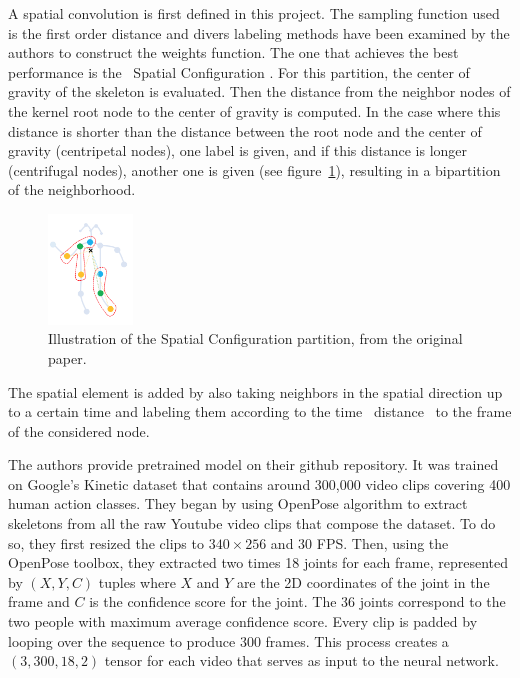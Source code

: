 \documentclass[12pt,a4paper,twoside]{article}
\begin{document}
A spatial convolution is first defined in this project. The sampling function used is the first order distance and divers labeling methods have been examined by the authors to construct the weights function. The one that achieves the best performance is the \guillemotleft~Spatial Configuration \guillemotright. For this partition, the center of gravity of the skeleton is evaluated. Then the distance from the neighbor nodes of the kernel root node to the center of gravity is computed. In the case where this distance is shorter than the distance between the root node and the center of gravity (centripetal nodes), one label is given, and if this distance is longer (centrifugal nodes), another one is given (see figure~\ref{fig:partition_strat}), resulting in a bipartition of the neighborhood.

\begin{figure}
    \centering
        \includegraphics[width=0.2\textwidth]{images/partition_strat}
    \caption{Illustration of the Spatial Configuration partition, from the original paper.}
\label{fig:partition_strat}
\end{figure}

The spatial element is added by also taking neighbors in the spatial direction up to a certain time and labeling them according to the time \guillemotleft~distance \guillemotright~to the frame of the considered node.

The authors provide pretrained model on their github repository. It was trained on Google's Kinetic dataset that contains around 300,000 video clips covering 400 human action classes. They began by using OpenPose algorithm to extract skeletons from all the raw Youtube video clips that compose the dataset. To do so, they first resized the clips to $340 \times 256$ and $30$ FPS. Then, using the OpenPose toolbox, they extracted two times 18 joints for each frame, represented by $(X,Y,C)$ tuples where $X$ and $Y$ are the 2D coordinates of the joint in the frame and $C$ is the confidence score for the joint. The 36 joints correspond to the two people with maximum average confidence score. Every clip is padded by looping over the sequence to produce 300 frames. This process creates a $(3, 300, 18, 2)$ tensor for each video that serves as input to the neural network. 
\end{document}
